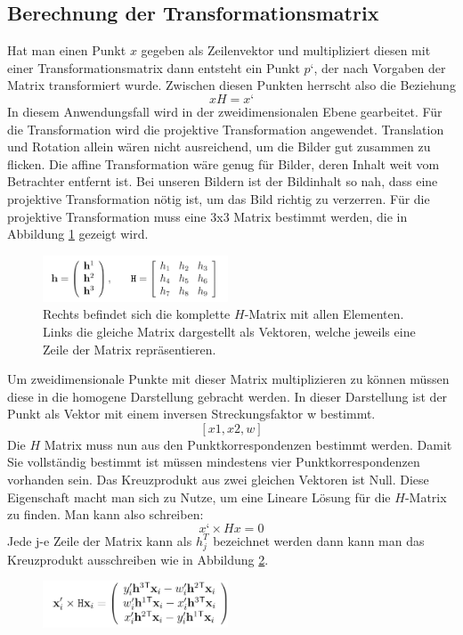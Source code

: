 \subsection{Berechnung der Transformationsmatrix }
Hat man einen Punkt $x$ gegeben als Zeilenvektor und multipliziert diesen mit einer Transformationsmatrix dann entsteht ein Punkt $p‘$, der nach Vorgaben der Matrix transformiert wurde. Zwischen diesen Punkten herrscht also die Beziehung
				$$x H =x‘$$
In diesem Anwendungsfall wird in der zweidimensionalen Ebene gearbeitet. Für die Transformation wird die projektive Transformation angewendet. Translation und Rotation allein wären nicht ausreichend, um die Bilder gut zusammen zu flicken. Die affine Transformation wäre genug für Bilder, deren Inhalt weit vom Betrachter entfernt ist. Bei unseren Bildern ist der Bildinhalt so nah, dass eine projektive Transformation nötig ist, um das Bild richtig zu verzerren. Für die projektive Transformation muss eine 3x3 Matrix bestimmt werden, die in Abbildung \ref{img:42} gezeigt wird.

\begin{figure}[ht]
    \centering
    \includegraphics[width=0.49\textwidth]{FiguresIS/42.jpg}
    \caption{\cite{Richard2000} Rechts befindet sich die komplette $H$-Matrix mit allen Elementen. Links die gleiche Matrix dargestellt als Vektoren, welche jeweils eine Zeile der Matrix repräsentieren.}
    \label{img:42}
\end{figure}

Um zweidimensionale Punkte mit dieser Matrix multiplizieren zu können müssen diese in die homogene Darstellung gebracht werden. In dieser Darstellung ist der Punkt als Vektor mit einem inversen Streckungsfaktor w bestimmt. 
				$$[x1, x2, w]$$
Die $H$ Matrix muss nun aus den Punktkorrespondenzen bestimmt werden. Damit Sie vollständig bestimmt ist müssen mindestens vier Punktkorrespondenzen vorhanden sein.
Das Kreuzprodukt aus zwei gleichen Vektoren ist Null. Diese Eigenschaft macht man sich zu Nutze, um eine Lineare Lösung für die $H$-Matrix zu finden. Man kann also schreiben:
			$$ x‘ \times H x=0$$
Jede j-e Zeile der Matrix kann als $h_j^T$ bezeichnet werden dann kann man das Kreuzprodukt ausschreiben wie in Abbildung \ref{img:40}.

\begin{figure}[ht]
    \centering
    \includegraphics[width=0.49\textwidth]{FiguresIS/40.jpg}
    \caption{\cite{Richard2000}}
     \label{img:40}
\end{figure}

